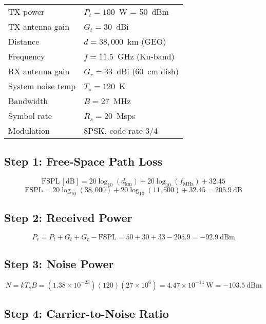 \begin{tabular}{@{}ll@{}}
TX power & $P_t = 100$~W = 50~dBm \\
TX antenna gain & $G_t = 30$~dBi \\
Distance & $d = 38{,}000$~km (GEO) \\
Frequency & $f = 11.5$~GHz (Ku-band) \\
RX antenna gain & $G_r = 33$~dBi (60~cm dish) \\
System noise temp & $T_s = 120$~K \\
Bandwidth & $B = 27$~MHz \\
Symbol rate & $R_s = 20$~Msps \\
Modulation & 8PSK, code rate 3/4 \\
\end{tabular}

\subsection*{Step 1: Free-Space Path Loss}

\begin{equation}
\mathrm{FSPL\,[dB]} = 20\log_{10}(d_{\text{km}}) + 20\log_{10}(f_{\text{MHz}}) + 32.45
\end{equation}
\begin{equation}
\mathrm{FSPL} = 20\log_{10}(38{,}000) + 20\log_{10}(11{,}500) + 32.45 = 205.9~\text{dB}
\end{equation}

\subsection*{Step 2: Received Power}

\begin{equation}
P_r = P_t + G_t + G_r - \mathrm{FSPL} = 50 + 30 + 33 - 205.9 = -92.9~\text{dBm}
\end{equation}

\subsection*{Step 3: Noise Power}

\begin{equation}
N = kT_sB = (1.38 \times 10^{-23})(120)(27 \times 10^6) = 4.47 \times 10^{-14}~\text{W} = -103.5~\text{dBm}
\end{equation}

\subsection*{Step 4: Carrier-to-Noise Ratio}

